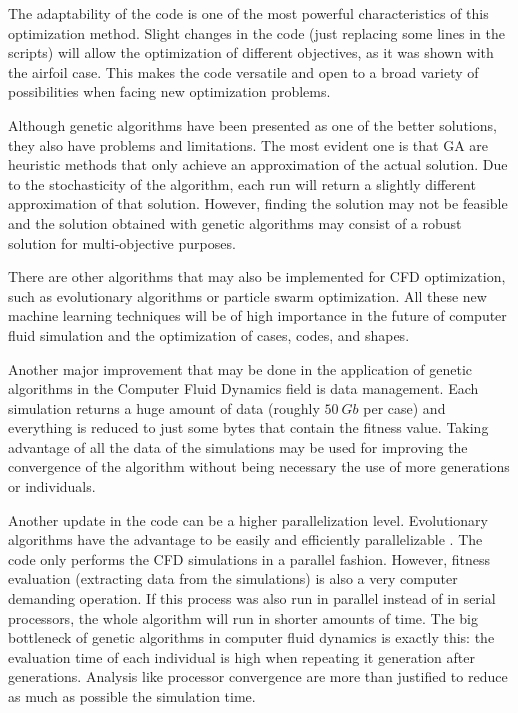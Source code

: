 The adaptability of the code is one of the most powerful characteristics of this optimization method. Slight changes in the code (just replacing some lines in the scripts) will allow the optimization of different objectives, as it was shown with the airfoil case. This makes the code versatile and open to a broad variety of possibilities when facing new optimization problems.

Although genetic algorithms have been presented as one of the better solutions, they also have problems and limitations. The most evident one is that GA are heuristic methods that only achieve an approximation of the actual solution. Due to the stochasticity of the algorithm, each run will return a slightly different approximation of that solution. However, finding the  solution may not be feasible and the solution obtained with genetic algorithms may consist of a robust solution for multi-objective purposes. 

There are other algorithms that may also be implemented for CFD optimization, such as evolutionary algorithms or particle swarm optimization. All these new machine learning techniques will be of high importance in the future of computer fluid simulation and the optimization of cases, codes, and shapes. 

Another major improvement that may be done in the application of genetic algorithms in the Computer Fluid Dynamics field is data management. Each simulation returns a huge amount of data (roughly $50\ Gb$ per case) and everything is reduced to just some bytes that contain the fitness value. Taking advantage of all the data of the simulations may be used for improving the convergence of the algorithm without being necessary the use of more generations or individuals. 

Another update in the code can be a higher parallelization level. Evolutionary algorithms have the advantage to be easily and efficiently parallelizable \cite{thevenin2008and}. The code only performs the CFD simulations in a parallel fashion. However, fitness evaluation (extracting data from the simulations) is also a very computer demanding operation. If this process was also run in parallel instead of in serial processors, the whole algorithm will run in shorter amounts of time. The big bottleneck of genetic algorithms in computer fluid dynamics is exactly this: the evaluation time of each individual is high when repeating it generation after generations. Analysis like processor convergence are more than justified to reduce as much as possible the simulation time.

